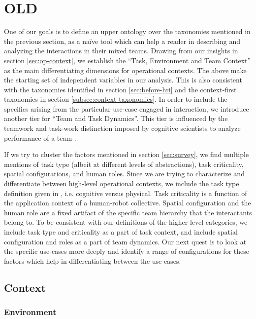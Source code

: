 \documentclass[letterpaper, 10 pt, conference]{ieeeconf}  %
\theoremstyle{definition}
\begin{document}
\section{OLD}

One of our goals is to define an upper ontology over the taxonomies mentioned in the previous section, as a na\" ive tool which can help a reader in describing and analyzing the interactions in their mixed teams.
Drawing from our insights in section \ref{sec:op-context}, we establish the ``Task, Environment and Team Context'' as the main differentiating dimensions for operational contexts.
The above make the starting set of independent variables in our analysis.
This is also consistent with the taxonomies identified in section \ref{sec:before-hri} and the context-first taxonomies in section \ref{subsec:context-taxonomies}.
In order to include the specifics arising from the particular use-case engaged in interaction, we introduce another tier for ``Team and Task Dynamics''.
This tier is influenced by the teamwork and task-work distinction imposed by cognitive scientists to analyze performance of a team \cite{Mathieu2000TheIO}.

If we try to cluster the factors mentioned in section \ref{sec:survey}, we find multiple mentions of task type (albeit at different levels of abstractions), task criticality, spatial configurations, and human roles.
Since we are trying to characterize and differentiate between high-level operational contexts, we include the task type definition given in \cite{Phillips2015}, i.e. cognitive versus physical.
Task criticality is a function of the application context of a human-robot collective.
Spatial configuration and the human role are a fixed artifact of the specific team hierarchy that the interactants belong to.
To be consistent with our definitions of the higher-level categories, we include task type and criticality as a part of task context, and include spatial configuration and roles as a part of team dynamics.
Our next quest is to look at the specific use-cases more deeply and identify a range of configurations for these factors which help in differentiating between the use-cases.

\subsection{Context}
\subsubsection{Environment}
\end{document}
